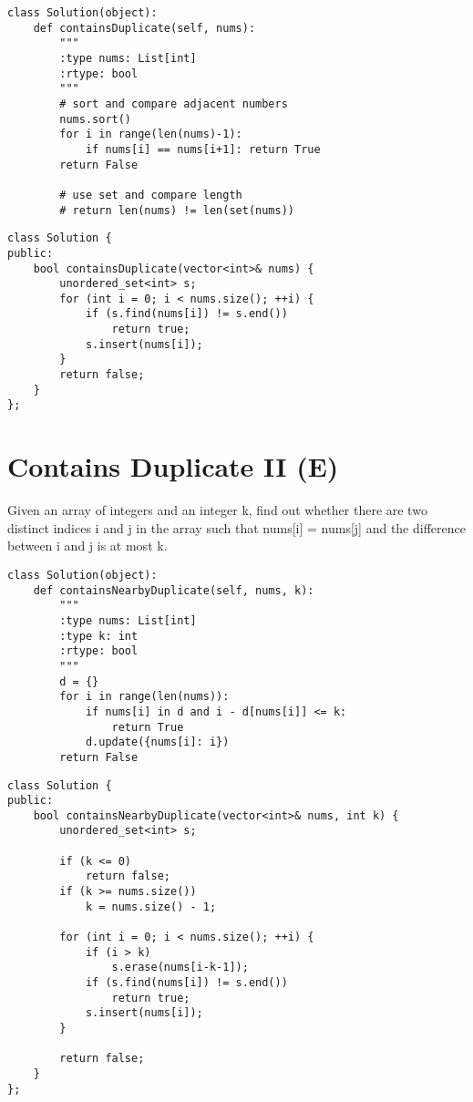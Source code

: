 \begin{lstlisting}
class Solution(object):
    def containsDuplicate(self, nums):
        """
        :type nums: List[int]
        :rtype: bool
        """
        # sort and compare adjacent numbers
        nums.sort()
        for i in range(len(nums)-1):
            if nums[i] == nums[i+1]: return True
        return False
    
        # use set and compare length
        # return len(nums) != len(set(nums))
\end{lstlisting}

\begin{lstlisting}
class Solution {
public:
    bool containsDuplicate(vector<int>& nums) {
        unordered_set<int> s;
        for (int i = 0; i < nums.size(); ++i) {
            if (s.find(nums[i]) != s.end())
                return true;
            s.insert(nums[i]);
        }
        return false;
    }
};
\end{lstlisting}


\section{Contains Duplicate II (E)}
Given an array of integers and an integer k, find out whether there are two distinct indices i and j in the array such that nums[i] = nums[j] and the difference between i and j is at most k. \\

\begin{lstlisting}
class Solution(object):
    def containsNearbyDuplicate(self, nums, k):
        """
        :type nums: List[int]
        :type k: int
        :rtype: bool
        """
        d = {}
        for i in range(len(nums)):
            if nums[i] in d and i - d[nums[i]] <= k:
                return True
            d.update({nums[i]: i})
        return False
\end{lstlisting}

\begin{lstlisting}
class Solution {
public:
    bool containsNearbyDuplicate(vector<int>& nums, int k) {
        unordered_set<int> s;
        
        if (k <= 0) 
            return false;
        if (k >= nums.size()) 
            k = nums.size() - 1;
       
        for (int i = 0; i < nums.size(); ++i) {
            if (i > k) 
                s.erase(nums[i-k-1]);
            if (s.find(nums[i]) != s.end())
                return true;
            s.insert(nums[i]);
        }
        
        return false;
    }
};
\end{lstlisting}


